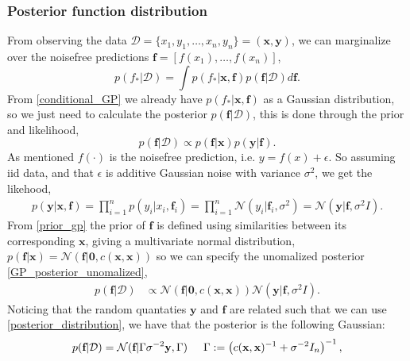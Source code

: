 \subsubsection{Posterior function distribution}
From observing the data $\mathcal{D} = \{x_1,y_1, \dots , x_n,y_n\} = (\textbf{x}, \textbf{y})$, we can marginalize over the noisefree
predictions $\textbf{f} = [f(x_1), \dots, f(x_n)]$, 
\begin{equation}\label{posterior_function_new}
    p(f_*|\mathcal{D})= \int p(f_*|\textbf{x}, \textbf{f})p(\textbf{f}|\mathcal{D})d\textbf{f}.
\end{equation} 
From \eqref{conditional_GP} we already have $p(f_*|\textbf{x}, \textbf{f})$ as a Gaussian distribution, so we just need to
calculate the posterior $p(\textbf{f}|\mathcal{D})$, this is done through the prior and likelihood, 
\begin{equation}\label{GP_posterior_unomalized}
    p(\textbf{f}|\mathcal{D}) \propto p(\textbf{f}|\textbf{x}) p(\textbf{y}|\textbf{f}).
\end{equation}
As mentioned $f(\cdot)$ is the noisefree prediction, i.e. $y
= f(x)+ \epsilon$. So assuming iid data, and that $\epsilon$ is additive Gaussian
noise with variance $\sigma^2$, we get the likehood, 
\begin{align*}
    p(\textbf{y}|\textbf{x}, \textbf{f}) = \prod_{i=1}^n p(y_i|x_i,\textbf{f}_i) = \prod_{i=1}^n \mathcal{N}(y_i|\textbf{f}_i,\sigma^2) = \mathcal{N}(\textbf{y}|\textbf{f},\sigma^2 I).
\end{align*}
From \eqref{prior_gp} the prior of $\textbf{f}$ is defined using similarities between its corresponding $\textbf{x}$, giving a
multivariate normal distribution, 
$p(\textbf{f}|\textbf{x}) = \mathcal{N}(\textbf{f}|\textbf{0},c(\textbf{x}, \textbf{x}))$
so we can specify the unomalized posterior \eqref{GP_posterior_unomalized},
\begin{align*}
    p(\textbf{f}|\mathcal{D}) &\propto \mathcal{N}(\textbf{f}|\textbf{0}, c(\textbf{x}, \textbf{x})) \mathcal{N}(\textbf{y}|\textbf{f},\sigma^2 I).
\end{align*}
Noticing that the random quantaties $\textbf{y}$ and $\textbf{f}$ are related such that we can use \eqref{posterior_distribution}, 
we have that the posterior is the following Gaussian: 
\begin{equation*}
    p(\textbf{f}|\mathcal{D}) = \mathcal{N}(\textbf{f}|\Gamma \sigma^{-2}\textbf{y}, \Gamma) \hspace{0.5cm} \Gamma := \left(c(\textbf{x}, \textbf{x})^{-1}+\sigma^{-2} I_n \right)^{-1},
\end{equation*}
